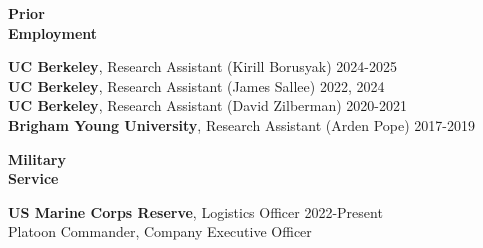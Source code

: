 \documentclass[10pt, oneside]{article}
\begin{document}
\begin{minipage}[t]{0.1\linewidth}
\textbf{Prior \\ Employment}
\end{minipage}\hspace{0.05\linewidth}
\begin{minipage}[t]{0.8\linewidth}
\textbf{UC Berkeley}, Research Assistant (Kirill Borusyak) \hfill 2024-2025 \\
\textbf{UC Berkeley}, Research Assistant (James Sallee) \hfill 2022, 2024 \\
\textbf{UC Berkeley}, Research Assistant (David Zilberman) \hfill 2020-2021 \\
\textbf{Brigham Young University}, Research Assistant (Arden Pope) \hfill 2017-2019 \\
\end{minipage}\vspace{5mm}

\begin{minipage}[t]{0.1\linewidth}
\textbf{Military \\ Service}
\end{minipage}\hspace{0.05\linewidth}
\begin{minipage}[t]{0.8\linewidth}
\textbf{US Marine Corps Reserve}, Logistics Officer \hfill 2022-Present \\
Platoon Commander, Company Executive Officer
\end{minipage}\vspace{5mm}
\end{document}
